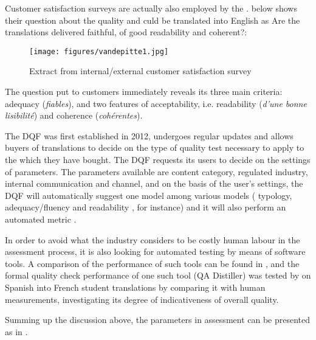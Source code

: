 \documentclass[output=paper]{langsci/langscibook}
\begin{document}
Customer satisfaction surveys are actually also employed by the \citeauthor{SCTA2015}.  below shows their question about the  quality and culd be translated into English as Are the translations delivered faithful, of good readability and coherent?:

\begin{figure}
\caption{\label{fig:key:1} Extract from \citeauthor{SCTA2015} internal/external customer satisfaction survey \citep{SCTA2015}}
\texttt{[image: figures/vandepitte1.jpg]}
\end{figure}

  The question put to \citeauthor{SCTA2015} customers immediately reveals its three main criteria: adequacy (\textit{fiables}), and two features of acceptability, i.e. readability (\textit{d'une bonne lisibilité}) and coherence (\textit{cohérentes}). 

The \citeauthor{TAUS2017dashboard} DQF was first established in 2012, undergoes regular updates and allows buyers of translations to decide on the type of quality test necessary to apply to the  which they have bought. The DQF requests its users to decide on the settings of parameters. The parameters available are content category, regulated industry, internal communication and channel, and on the basis of the user's settings, the DQF will automatically suggest one  model among various  models ( typology, adequacy/fluency and readability , for instance) and it will also perform an automated  metric \citep{TAUS2017dashboard}. 

In order to avoid what the industry considers to be costly human labour in the  assessment process, it is also looking for automated testing by means of software tools. A comparison of the performance of such tools can be found in \citet{Debove2011}, and the formal quality check performance of one such tool (QA Distiller) was tested by \citet{Depraetere2011} on Spanish into French student translations by comparing it with human measurements, investigating its degree of indicativeness of overall quality.

\largerpage
Summing up the discussion above, the parameters in  assessment can be presented as in . 
\end{document}
